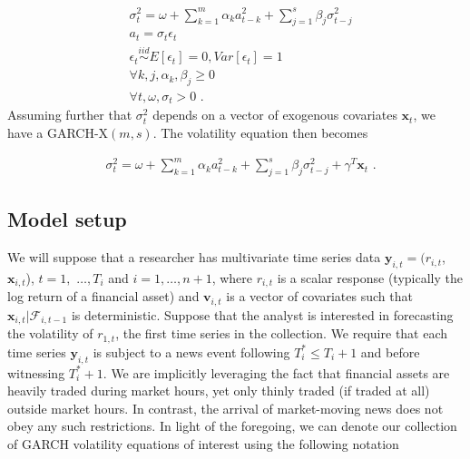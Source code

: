 \documentclass[11pt]{article}
\newcommand{\y}{\textbf{y}}
\newcommand{\x}{\textbf{x}}
\newcommand{\simiid}{\stackrel{iid}{\sim}} %
\theoremstyle{definition}
\begin{document}
\begin{align*}
&\sigma_{t}^{2} = \omega + \sum^{m}_{k=1}\alpha_{k}a^{2}_{t-k} + \sum_{j=1}^{s}\beta_{j}\sigma_{t-j}^{2}\\
&a_{t} = \sigma_{t}\epsilon_{t}\\
&\epsilon_{t} \simiid E[\epsilon_{t}]=0, Var[\epsilon_{t}] = 1\\
&\forall k,j, \alpha_{k},\beta_{j}\geq 0\\ 
&\forall t, \omega, \sigma_{t} > 0 \text { .} 
\end{align*}
Assuming further that $\sigma^{2}_{t}$ depends on a vector of exogenous covariates $\x_{t}$, we have a  GARCH-X$(m,s)$.  The volatility equation then becomes 

\begin{align}
&\sigma_{t}^{2} = \omega+ \sum^{m}_{k=1}\alpha_{k}a^{2}_{t-k} + \sum_{j=1}^{s}\beta_{j}\sigma_{t-j}^{2} + \gamma^{T}\x_{t} \text{ .}\label{GARCH-X}
\end{align}


\subsection{Model setup}
\label{modelsetup}
We will suppose that a researcher has multivariate time series data $\y_{i,t} = (r_{i,t}$, $\x_{i,t}$), $t = 1,$ $\ldots,  T_i$ and $i = 1, \ldots, n+1$, where $r_{i,t}$ is a scalar response (typically the log return of a financial asset) and  $\textbf{v}_{i,t}$ is a vector of covariates such that $\x_{i,t}|\mathcal{F}_{i,t-1}$ is deterministic.  Suppose that the analyst is interested in forecasting the volatility of $r_{1,t}$, the first time series in the collection.  We require that each time series $\y_{i,t}$ is subject to a news event following $T^*_i \leq T_{i} + 1$ and before witnessing $T^*_i+1$.  We are implicitly leveraging the fact that financial assets are heavily traded during market hours, yet only thinly traded (if traded at all) outside market hours.  In contrast, the arrival of market-moving news does not obey any such restrictions.  In light of the foregoing, we can denote our collection of GARCH volatility equations of interest using the following notation
\end{document}
